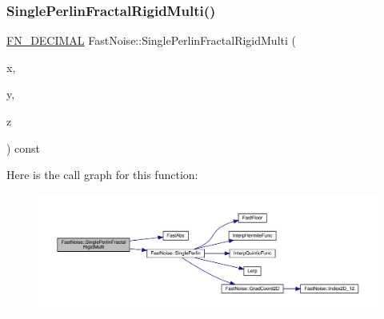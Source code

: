 \subsubsection{\texorpdfstring{Single\+Perlin\+Fractal\+Rigid\+Multi()}{SinglePerlinFractalRigidMulti()}\hspace{0.1cm}{\footnotesize\ttfamily [2/2]}}
{\footnotesize\ttfamily \mbox{\hyperlink{_fast_noise_8h_a75a9ef6d2541c4921815b885bfd449c3}{F\+N\+\_\+\+D\+E\+C\+I\+M\+AL}} Fast\+Noise\+::\+Single\+Perlin\+Fractal\+Rigid\+Multi (\begin{DoxyParamCaption}\item[{\mbox{\hyperlink{_fast_noise_8h_a75a9ef6d2541c4921815b885bfd449c3}{F\+N\+\_\+\+D\+E\+C\+I\+M\+AL}}}]{x,  }\item[{\mbox{\hyperlink{_fast_noise_8h_a75a9ef6d2541c4921815b885bfd449c3}{F\+N\+\_\+\+D\+E\+C\+I\+M\+AL}}}]{y,  }\item[{\mbox{\hyperlink{_fast_noise_8h_a75a9ef6d2541c4921815b885bfd449c3}{F\+N\+\_\+\+D\+E\+C\+I\+M\+AL}}}]{z }\end{DoxyParamCaption}) const\hspace{0.3cm}{\ttfamily [private]}}

Here is the call graph for this function\+:
\nopagebreak
\begin{figure}[H]
\begin{center}
\leavevmode
\includegraphics[width=350pt]{d1/dd8/class_fast_noise_ad5d0bbafb8bc1e07c3d771455736600d_cgraph}
\end{center}
\end{figure}
\mbox{\label{class_fast_noise_a1aa539b6129719546bb4ed2847f1a11f}} 
